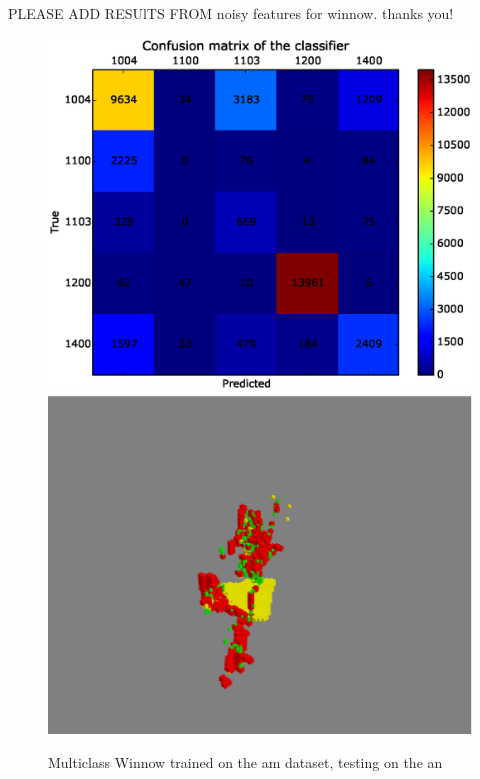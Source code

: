 \documentclass[10pt,a4paper]{article}
\begin{document}
{\color{blue} PLEASE ADD RESUlTS FROM noisy features for winnow. thanks you!}
\begin{figure}[htp]
\centering
\includegraphics[scale=0.4,trim = 0.3 0.3 0.3 0.3,clip]{figs/winnow_amtoan_test1.eps}
\includegraphics[scale=0.4]{figs/winnow_amtoan_test1_plot.eps}
\caption{Multiclass Winnow trained on the am dataset, testing on the an}
\vspace{0.1 in}

\end{figure}
\end{document}
